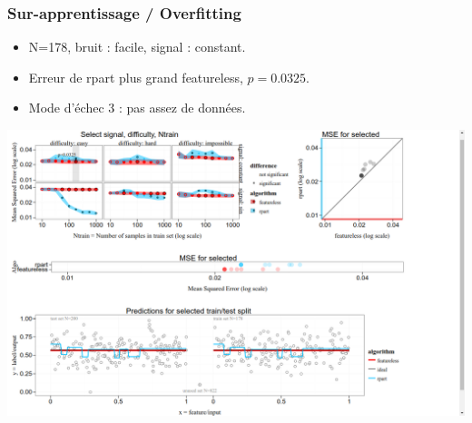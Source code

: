 \documentclass{beamer}
\begin{document}
\begin{frame}
  \frametitle{Sur-apprentissage / Overfitting}
  \begin{itemize}
  \item N=178, bruit : facile, signal : constant.
  \item Erreur de rpart plus grand featureless, $p=0.0325$.
  \item Mode d'échec 3 : pas assez de données.
  \end{itemize}
  \includegraphics[width=\textwidth]{easy-overfit-constant}
\end{frame}
\end{document}
